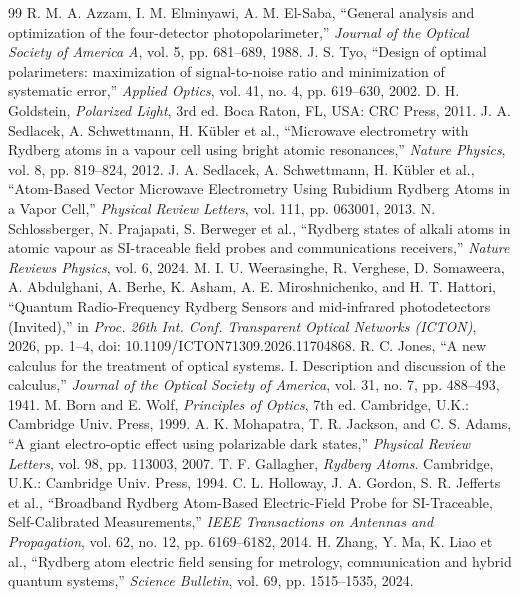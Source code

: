 \begin{thebibliography}{99}
 R. M. A. Azzam, I. M. Elminyawi, A. M. El-Saba, ``General analysis and optimization of the four-detector photopolarimeter,'' \emph{Journal of the Optical Society of America A}, vol. 5, pp. 681--689, 1988.
 J. S. Tyo, ``Design of optimal polarimeters: maximization of signal-to-noise ratio and minimization of systematic error,'' \emph{Applied Optics}, vol. 41, no. 4, pp. 619--630, 2002.
 D. H. Goldstein, \emph{Polarized Light}, 3rd ed. Boca Raton, FL, USA: CRC Press, 2011.
 J. A. Sedlacek, A. Schwettmann, H. K\"ubler et al., ``Microwave electrometry with Rydberg atoms in a vapour cell using bright atomic resonances,'' \emph{Nature Physics}, vol. 8, pp. 819--824, 2012.
 J. A. Sedlacek, A. Schwettmann, H. K\"ubler et al., ``Atom-Based Vector Microwave Electrometry Using Rubidium Rydberg Atoms in a Vapor Cell,'' \emph{Physical Review Letters}, vol. 111, pp. 063001, 2013.
 N. Schlossberger, N. Prajapati, S. Berweger et al., ``Rydberg states of alkali atoms in atomic vapour as SI-traceable field probes and communications receivers,'' \emph{Nature Reviews Physics}, vol. 6, 2024.
 M. I. U. Weerasinghe, R. Verghese, D. Somaweera, A. Abdulghani, A. Berhe, K. Asham, A. E. Miroshnichenko, and H. T. Hattori, ``Quantum Radio-Frequency Rydberg Sensors and mid-infrared photodetectors (Invited),'' in \emph{Proc. 26th Int. Conf. Transparent Optical Networks (ICTON)}, 2026, pp. 1--4, doi: 10.1109/ICTON71309.2026.11704868.
 R. C. Jones, ``A new calculus for the treatment of optical systems. I. Description and discussion of the calculus,'' \emph{Journal of the Optical Society of America}, vol. 31, no. 7, pp. 488--493, 1941.
 M. Born and E. Wolf, \emph{Principles of Optics}, 7th ed. Cambridge, U.K.: Cambridge Univ. Press, 1999.
 A. K. Mohapatra, T. R. Jackson, and C. S. Adams, ``A giant electro-optic effect using polarizable dark states,'' \emph{Physical Review Letters}, vol. 98, pp. 113003, 2007.
 T. F. Gallagher, \emph{Rydberg Atoms}. Cambridge, U.K.: Cambridge Univ. Press, 1994.
 C. L. Holloway, J. A. Gordon, S. R. Jefferts et al., ``Broadband Rydberg Atom-Based Electric-Field Probe for SI-Traceable, Self-Calibrated Measurements,'' \emph{IEEE Transactions on Antennas and Propagation}, vol. 62, no. 12, pp. 6169--6182, 2014.
 H. Zhang, Y. Ma, K. Liao et al., ``Rydberg atom electric field sensing for metrology, communication and hybrid quantum systems,'' \emph{Science Bulletin}, vol. 69, pp. 1515--1535, 2024.

\end{thebibliography}
